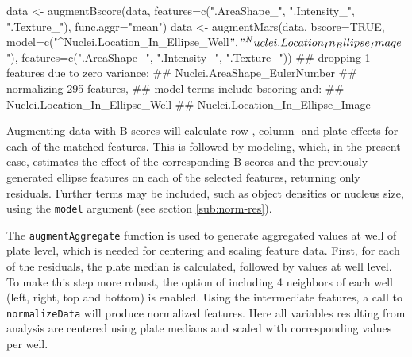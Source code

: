 \begin{rflow}
data <- augmentBscore(data, features=c(".AreaShape_", ".Intensity_",
                                       ".Texture_"),
                      func.aggr="mean")
data <- augmentMars(data, bscore=TRUE,
                    model=c("^Nuclei.Location_In_Ellipse_Well$",
                            "^Nuclei.Location_In_Ellipse_Image$"),
                    features=c(".AreaShape_", ".Intensity_",
                               ".Texture_"))
## dropping 1 features due to zero variance:
##   Nuclei.AreaShape_EulerNumber
## normalizing 295 features,
## model terms include bscoring and:
##   Nuclei.Location_In_Ellipse_Well
##   Nuclei.Location_In_Ellipse_Image

\end{rflow}


Augmenting data with B-scores will calculate row-, column- and plate-effects for each of the matched features. This is followed by  modeling, which, in the present case, estimates the effect of the corresponding B-scores and the previously generated ellipse features on each of the selected features, returning only residuals. Further terms may be included, such as object densities or nucleus size, using the \texttt{model} argument (see section \ref{sub:norm-res}).



The \texttt{augmentAggregate} function is used to generate aggregated values at well of plate level, which is needed for centering and scaling feature data. First, for each of the  residuals, the plate median is calculated, followed by  values at well level. To make this step more robust, the option of including 4 neighbors of each well (left, right, top and bottom) is enabled. Using the intermediate features, a call to \texttt{normalizeData} will produce normalized features. Here all variables resulting from  analysis are centered using plate medians and scaled with corresponding  values per well.

